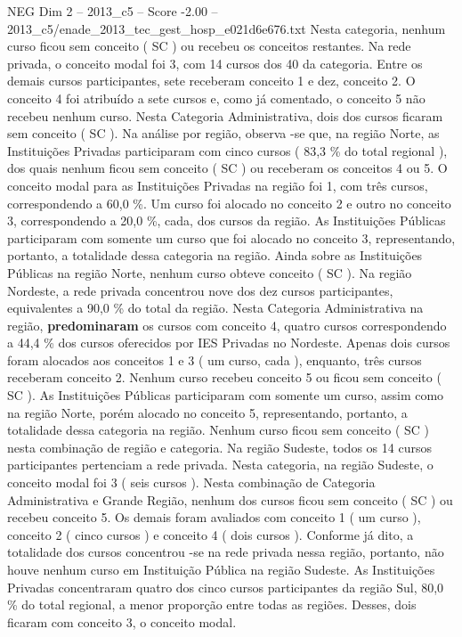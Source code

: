 \begin{textsample}{NEG Dim 2 – 2013\_c5 – Score -2.00 – 2013\_c5/enade\_2013\_tec\_gest\_hosp\_e021d6e676.txt}
Nesta categoria, nenhum curso ficou sem conceito ( SC ) ou recebeu os conceitos restantes.
Na rede privada, o conceito modal foi 3, com 14 cursos dos 40 da categoria.
Entre os demais cursos participantes, sete receberam conceito 1 e dez, conceito 2.
O conceito 4 foi atribuído a sete cursos e, como já comentado, o conceito 5 não recebeu nenhum curso.
Nesta Categoria Administrativa, dois dos cursos ficaram sem conceito ( SC ).
Na análise por região, observa -se que, na região Norte, as Instituições Privadas participaram com cinco cursos ( 83,3 \% do total regional ), dos quais nenhum ficou sem conceito ( SC ) ou receberam os conceitos 4 ou 5.
O conceito modal para as Instituições Privadas na região foi 1, com três cursos, correspondendo a 60,0 \%.
Um curso foi alocado no conceito 2 e outro no conceito 3, correspondendo a 20,0 \%, cada, dos cursos da região.
As Instituições Públicas participaram com somente um curso que foi alocado no conceito 3, representando, portanto, a totalidade dessa categoria na região.
Ainda sobre as Instituições Públicas na região Norte, nenhum curso obteve conceito ( SC ).
Na região Nordeste, a rede privada concentrou nove dos dez cursos participantes, equivalentes a 90,0 \% do total da região.
Nesta Categoria Administrativa na região, \textbf{predominaram} os cursos com conceito 4, quatro cursos correspondendo a 44,4 \% dos cursos oferecidos por IES Privadas no Nordeste.
Apenas dois cursos foram alocados aos conceitos 1 e 3 ( um curso, cada ), enquanto, três cursos receberam conceito 2.
Nenhum curso recebeu conceito 5 ou ficou sem conceito ( SC ).
As Instituições Públicas participaram com somente um curso, assim como na região Norte, porém alocado no conceito 5, representando, portanto, a totalidade dessa categoria na região.
Nenhum curso ficou sem conceito ( SC ) nesta combinação de região e categoria.
Na região Sudeste, todos os 14 cursos participantes pertenciam a rede privada.
Nesta categoria, na região Sudeste, o conceito modal foi 3 ( seis cursos ).
Nesta combinação de Categoria Administrativa e Grande Região, nenhum dos cursos ficou sem conceito ( SC ) ou recebeu conceito 5.
Os demais foram avaliados com conceito 1 ( um curso ), conceito 2 ( cinco cursos ) e conceito 4 ( dois cursos ).
Conforme já dito, a totalidade dos cursos concentrou -se na rede privada nessa região, portanto, não houve nenhum curso em Instituição Pública na região Sudeste.
As Instituições Privadas concentraram quatro dos cinco cursos participantes da região Sul, 80,0 \% do total regional, a menor proporção entre todas as regiões.
Desses, dois ficaram com conceito 3, o conceito modal.

\end{textsample}
